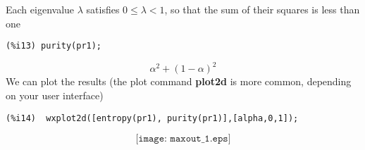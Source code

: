 \documentclass[leqno]{article}
\newcommand{\fs}[1]{{\bf #1}}
\begin{document}
Each eigenvalue $\lambda$ satisfies $0\le \lambda <1$, so that the sum of their squares is less than
one 
\begin{verbatim}
(%i13) purity(pr1);
\end{verbatim}
\begin{dmath}[number={\%o13}]
 \alpha^{2}+\left(1-\alpha\right)^{2}\end{dmath}
We can plot the results (the plot command \fs{plot2d} is more common, depending on your 
 user interface)
\begin{verbatim}
(%i14)  wxplot2d([entropy(pr1), purity(pr1)],[alpha,0,1]);
\end{verbatim}
\begin{dmath}[number={\%o14}]
\texttt{[image: maxout\_1.eps]}
\end{dmath}
\end{document}
